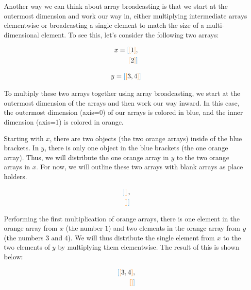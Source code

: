 Another way we can think about array broadcasting is that we start at the outermost dimension and work our way in, either multiplying intermediate arrays elementwise or broadcasting a single element to match the size of a multi-dimensional element. 
To see this, let's consider the following two arrays:

\begin{align*}
x = \textcolor{blue}{[} \textcolor{orange}{[} 1 \textcolor{orange}{]}, \\
\textcolor{orange}{[} 2 \textcolor{orange}{]} \textcolor{blue}{]} \\
\end{align*} 

\begin{align*}
 y = \textcolor{blue}{[} \textcolor{orange}{[} 3, 4 \textcolor{orange}{]} \textcolor{blue}{]}
\end{align*}

To multiply these two arrays together using array broadcasting, we start at the outermost dimension of the arrays and then work our way inward.
In this case, the outermost dimension (axis=0) of our arrays is colored in blue, and the inner dimension (axis=1) is colored in orange.

Starting with $x$, there are two objects (the two orange arrays) inside of the blue brackets. 
In $y$, there is only one object in the blue brackets (the one orange array). 
Thus, we will distribute the one orange array in $y$ to the two orange arrays in $x$. For now, we will outline these two arrays with blank arrays as place holders.

\begin{align*}
\textcolor{blue}{[} \textcolor{orange}{[} \textcolor{orange}{]}, \\
\textcolor{orange}{[} \textcolor{orange}{]} \textcolor{blue}{]}\\
\end{align*}

Performing the first multiplication of orange arrays, there is one element in the orange array from $x$ (the number $1$) and two elements in the orange array from $y$ (the numbers $3$ and $4$). 
We will thus distribute the single element from $x$ to the two elements of $y$ by multiplying them elementwise.
The result of this is shown below:

\begin{align*}
\textcolor{blue}{[} \textcolor{orange}{[} 3, 4 \textcolor{orange}{]}, \\
\textcolor{orange}{[} \textcolor{orange}{]} \textcolor{blue}{]}\\
\end{align*}

